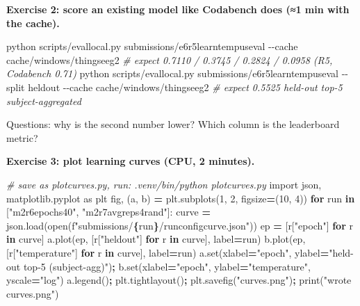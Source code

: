 \documentclass[
  11pt,
]{article}
\newenvironment{Shaded}{\begin{snugshade}}{\end{snugshade}}
\newcommand{\AttributeTok}[1]{\textcolor[rgb]{0.13,0.29,0.53}{#1}}
\newcommand{\BuiltInTok}[1]{#1}
\newcommand{\CommentTok}[1]{\textcolor[rgb]{0.56,0.35,0.01}{\textit{#1}}}
\newcommand{\ControlFlowTok}[1]{\textcolor[rgb]{0.13,0.29,0.53}{\textbf{#1}}}
\newcommand{\DecValTok}[1]{\textcolor[rgb]{0.00,0.00,0.81}{#1}}
\newcommand{\ExtensionTok}[1]{#1}
\newcommand{\ImportTok}[1]{#1}
\newcommand{\KeywordTok}[1]{\textcolor[rgb]{0.13,0.29,0.53}{\textbf{#1}}}
\newcommand{\NormalTok}[1]{#1}
\newcommand{\OperatorTok}[1]{\textcolor[rgb]{0.81,0.36,0.00}{\textbf{#1}}}
\newcommand{\SpecialCharTok}[1]{\textcolor[rgb]{0.81,0.36,0.00}{\textbf{#1}}}
\newcommand{\SpecialStringTok}[1]{\textcolor[rgb]{0.31,0.60,0.02}{#1}}
\newcommand{\StringTok}[1]{\textcolor[rgb]{0.31,0.60,0.02}{#1}}
\renewcommand{\_}{\oldunderscore\allowbreak}
\begin{document}
\textbf{Exercise 2: score an existing
model like Codabench does (≈1 min with
the cache).}

\begin{Shaded}
\begin{Highlighting}[]
\ExtensionTok{python}\NormalTok{ scripts/eval\_local.py submissions/e6\_r5\_learntemp\_useval }\AttributeTok{{-}{-}cache}\NormalTok{ cache/windows/things\_eeg2}
\CommentTok{\# expect 0.7110 / 0.3745 / 0.2824 / 0.0958 (R5, Codabench 0.71)}
\ExtensionTok{python}\NormalTok{ scripts/eval\_local.py submissions/e6\_r5\_learntemp\_useval }\AttributeTok{{-}{-}split}\NormalTok{ heldout }\AttributeTok{{-}{-}cache}\NormalTok{ cache/windows/things\_eeg2}
\CommentTok{\# expect 0.5525 held{-}out top{-}5 subject{-}aggregated}
\end{Highlighting}
\end{Shaded}

Questions: why is the second number
lower? Which column is the leaderboard
metric?

\textbf{Exercise 3: plot learning curves
(CPU, 2 minutes).}

\begin{Shaded}
\begin{Highlighting}[]
\CommentTok{\# save as plot\_curves.py, run: .venv/bin/python plot\_curves.py}
\ImportTok{import}\NormalTok{ json, matplotlib.pyplot }\ImportTok{as}\NormalTok{ plt}
\NormalTok{fig, (a, b) }\OperatorTok{=}\NormalTok{ plt.subplots(}\DecValTok{1}\NormalTok{, }\DecValTok{2}\NormalTok{, figsize}\OperatorTok{=}\NormalTok{(}\DecValTok{10}\NormalTok{, }\DecValTok{4}\NormalTok{))}
\ControlFlowTok{for}\NormalTok{ run }\KeywordTok{in}\NormalTok{ [}\StringTok{"m2\_r6\_epochs40"}\NormalTok{, }\StringTok{"m2\_r7\_avgreps4rand"}\NormalTok{]:}
\NormalTok{    curve }\OperatorTok{=}\NormalTok{ json.load(}\BuiltInTok{open}\NormalTok{(}\SpecialStringTok{f"submissions/}\SpecialCharTok{\{}\NormalTok{run}\SpecialCharTok{\}}\SpecialStringTok{/run\_config\_curve.json"}\NormalTok{))}
\NormalTok{    ep }\OperatorTok{=}\NormalTok{ [r[}\StringTok{"epoch"}\NormalTok{] }\ControlFlowTok{for}\NormalTok{ r }\KeywordTok{in}\NormalTok{ curve]}
\NormalTok{    a.plot(ep, [r[}\StringTok{"heldout"}\NormalTok{] }\ControlFlowTok{for}\NormalTok{ r }\KeywordTok{in}\NormalTok{ curve], label}\OperatorTok{=}\NormalTok{run)}
\NormalTok{    b.plot(ep, [r[}\StringTok{"temperature"}\NormalTok{] }\ControlFlowTok{for}\NormalTok{ r }\KeywordTok{in}\NormalTok{ curve], label}\OperatorTok{=}\NormalTok{run)}
\NormalTok{a.}\BuiltInTok{set}\NormalTok{(xlabel}\OperatorTok{=}\StringTok{"epoch"}\NormalTok{, ylabel}\OperatorTok{=}\StringTok{"held{-}out top{-}5 (subject{-}agg)"}\NormalTok{)}\OperatorTok{;}\NormalTok{ b.}\BuiltInTok{set}\NormalTok{(xlabel}\OperatorTok{=}\StringTok{"epoch"}\NormalTok{, ylabel}\OperatorTok{=}\StringTok{"temperature"}\NormalTok{, yscale}\OperatorTok{=}\StringTok{"log"}\NormalTok{)}
\NormalTok{a.legend()}\OperatorTok{;}\NormalTok{ plt.tight\_layout()}\OperatorTok{;}\NormalTok{ plt.savefig(}\StringTok{"curves.png"}\NormalTok{)}\OperatorTok{;} \BuiltInTok{print}\NormalTok{(}\StringTok{"wrote curves.png"}\NormalTok{)}
\end{Highlighting}
\end{Shaded}
\end{document}
